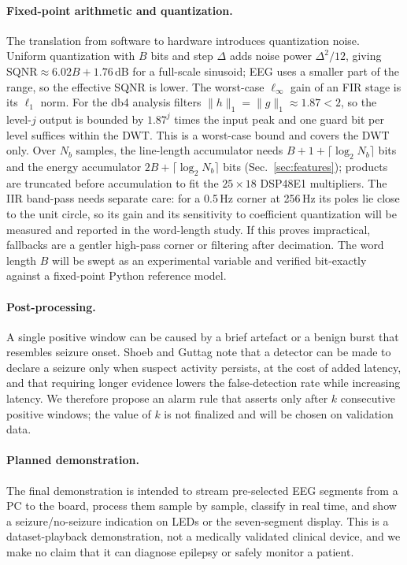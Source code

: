 \documentclass[10pt,twocolumn,letterpaper]{article}
\begin{document}
\paragraph{Fixed-point arithmetic and quantization.} The translation
from software to hardware introduces quantization noise. Uniform
quantization with $B$ bits and step $\Delta$ adds noise power
$\Delta^{2}/12$, giving $\mathrm{SQNR}\approx6.02B+1.76$\,dB for a
full-scale sinusoid; EEG uses a smaller part of the range, so the
effective SQNR is lower. The worst-case $\ell_\infty$ gain of an FIR
stage is its $\ell_1$ norm. For the db4 analysis filters
$\|h\|_1=\|g\|_1\approx1.87<2$, so the level-$j$ output is bounded by
$1.87^{j}$ times the input peak and one guard bit per level suffices
within the DWT. This is a worst-case bound and covers the DWT only.
Over $N_b$ samples, the line-length accumulator needs
$B+1+\lceil\log_2 N_b\rceil$ bits and the energy accumulator
$2B+\lceil\log_2 N_b\rceil$ bits (Sec.~\ref{sec:features}); products are
truncated before accumulation to fit the $25\times18$ DSP48E1
multipliers. The IIR band-pass needs separate care: for a 0.5\,Hz corner
at 256\,Hz its poles lie close to the unit circle, so its gain and its
sensitivity to coefficient quantization will be measured and reported in
the word-length study. If this proves impractical, fallbacks are a
gentler high-pass corner or filtering after decimation. The word length
$B$ will be swept as an experimental variable and verified bit-exactly
against a fixed-point Python reference model.

\paragraph{Post-processing.} A single positive window can be caused by
a brief artefact or a benign burst that resembles seizure onset. Shoeb
and Guttag \cite{shoeb2010icml} note that a detector can be made to
declare a seizure only when suspect activity persists, at the cost of
added latency, and that requiring longer evidence lowers the
false-detection rate while increasing latency. We therefore propose an
alarm rule that asserts only after $k$ consecutive positive windows; the
value of $k$ is not finalized and will be chosen on validation data.

\paragraph{Planned demonstration.} The final demonstration is intended
to stream pre-selected EEG segments from a PC to the board, process them
sample by sample, classify in real time, and show a seizure/no-seizure
indication on LEDs or the seven-segment display. This is a
dataset-playback demonstration, not a medically validated clinical
device, and we make no claim that it can diagnose epilepsy or safely
monitor a patient.
\end{document}
